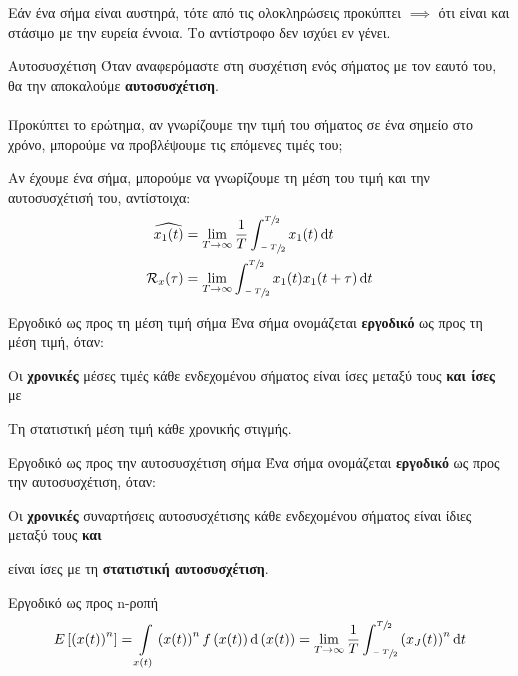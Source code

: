 \documentclass[11pt,a4paper,notitlepage,fleqn,final]{article}
\begin{document}
Εάν ένα σήμα είναι αυστηρά, τότε από τις ολοκληρώσεις προκύπτει
\( \implies \) ότι είναι και στάσιμο με την ευρεία έννοια. Το
αντίστροφο δεν ισχύει εν γένει.

\begin{defn}{Αυτοσυσχέτιση}{}
	Όταν αναφερόμαστε στη συσχέτιση ενός σήματος με τον εαυτό του,
	θα την αποκαλούμε \textbf{αυτοσυσχέτιση}.
\end{defn}

\paragraph{}
Προκύπτει το ερώτημα, αν γνωρίζουμε την τιμή του σήματος σε ένα
σημείο στο χρόνο, μπορούμε να προβλέψουμε τις επόμενες τιμές του;

Αν έχουμε ένα σήμα, μπορούμε να γνωρίζουμε τη μέση του τιμή και την
αυτοσυσχέτισή του, αντίστοιχα:
\begin{align*}
	\widehat{x_1(t)} &= \lim_{T\to \infty} \frac{1}{T}
	\int_{\sfrac{-T}{2} }^{\sfrac{T}{2} } x_1(t)\mathop{}\!\mathrm{d} t
	\\
	\mathcal{R}_x(\tau) &= \lim_{T\to \infty}
	\int_{\sfrac{-T}{2} }^{\sfrac{T}{2} } x_1(t)x_1(t+\tau)\mathop{}\!\mathrm{d} t
\end{align*}

\begin{defn}{Εργοδικό ως προς τη μέση τιμή σήμα}{}
	Ένα σήμα ονομάζεται \textbf{εργοδικό} ως προς τη μέση τιμή, όταν:
	\begin{enumparen}
		\item Οι \textbf{χρονικές} μέσες τιμές κάθε ενδεχομένου σήματος
		είναι ίσες μεταξύ τους \textbf{και ίσες} με
		\item Τη στατιστική μέση τιμή κάθε χρονικής στιγμής.
	\end{enumparen}
\end{defn}

\begin{defn}{Εργοδικό ως προς την αυτοσυσχέτιση σήμα}{}
	Ένα σήμα ονομάζεται \textbf{εργοδικό} ως προς την αυτοσυσχέτιση,
	όταν:
	\begin{enumparen}
		\item Οι \textbf{χρονικές} συναρτήσεις αυτοσυσχέτισης
		κάθε ενδεχομένου σήματος
		είναι ίδιες μεταξύ τους \textbf{και}
		\item είναι ίσες με τη \textbf{στατιστική αυτοσυσχέτιση}.
	\end{enumparen}
\end{defn}

\begin{defn}{Εργοδικό ως προς n-ροπή}{}
	\[
	E\left[\left(x(t)\right)^n\right] =
	\int\limits_{x(t)} \left(x(t)\right)^n
	f\left(x(t)\right) \mathop{}\!\mathrm{d}\left(x(t)\right)
	= \lim_{T\to \infty} \frac{1}{T}
	\int_{\sfrac{-T}{2} }^{\sfrac{T}{2} }
	\left(x_J(t)\right)^n \mathop{}\!\mathrm{d} t
	\]
\end{defn}
\end{document}
